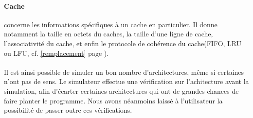 \paragraph{Cache} concerne les informations spécifiques à un cache en particulier. Il donne notamment la taille en octets du caches, la taille d'une ligne de cache, l'associativité du cache, et enfin le protocole de cohérence du cache(FIFO, LRU ou LFU, cf. \ref{remplacement} page \pageref{remplacement}).

\paragraph{}
Il est ainsi possible de simuler un bon nombre d'architectures, même si certaines n'ont pas de sens. Le simulateur effectue une vérification sur l'achitecture avant la simulation, afin d'écarter certaines architectures qui ont de grandes chances de faire planter le programme. Nous avons néanmoins laissé à l'utilisateur la possibilité de passer outre ces vérifications.



